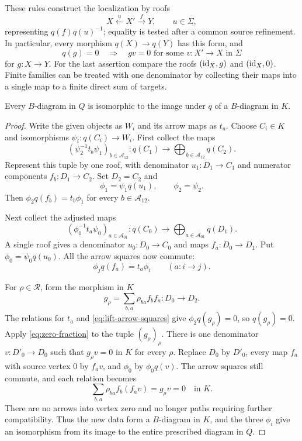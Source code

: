 These rules construct the localization by roofs
\[
  X\xleftarrow{u}X'\xrightarrow{f}Y,
  \qquad u\in\Sigma,
\]
representing $q(f)q(u)^{-1}$; equality is tested after a common source
refinement.  In particular, every morphism $q(X)\to q(Y)$ has this
form, and
\begin{equation}\label{eq:zero-fraction}
  q(g)=0\quad\Longrightarrow\quad
  gv=0\text{ for some }v:X'\to X\text{ in }\Sigma
\end{equation}
for $g:X\to Y$.  For the last assertion compare the roofs
$(\operatorname{id}_X,g)$ and $(\operatorname{id}_X,0)$.
Finite families can be treated with one denominator by collecting
their maps into a single map to a finite direct sum of targets.

\begin{lemma}\label{lem:diagram-lift}
Every $B$-diagram in $Q$ is isomorphic to the image under $q$ of a
$B$-diagram in $K$.
\end{lemma}

\begin{proof}
Write the given objects as $W_i$ and its arrow maps as $t_a$.
Choose $C_i\in K$ and isomorphisms $\psi_i:q(C_i)\to W_i$.
First collect the maps
\[
  (\psi_2^{-1}t_b\psi_1)_{b\in\mathcal A_{12}}:
     q(C_1)\longrightarrow
     \bigoplus_{b\in\mathcal A_{12}}q(C_2).
\]
Represent this tuple by one roof, with denominator
$u_1:D_1\to C_1$ and numerator components $f_b:D_1\to C_2$.
Set $D_2=C_2$ and
\[
  \phi_1=\psi_1q(u_1),\qquad \phi_2=\psi_2.
\]
Then $\phi_2q(f_b)=t_b\phi_1$ for every $b\in\mathcal A_{12}$.

Next collect the adjusted maps
\[
  (\phi_1^{-1}t_a\psi_0)_{a\in\mathcal A_{01}}:
     q(C_0)\longrightarrow
     \bigoplus_{a\in\mathcal A_{01}}q(D_1).
\]
A single roof gives a denominator $u_0:D_0\to C_0$ and maps
$f_a:D_0\to D_1$.  Put $\phi_0=\psi_0q(u_0)$.
All the arrow squares now commute:
\begin{equation}\label{eq:lift-arrow-squares}
  \phi_jq(f_a)=t_a\phi_i\qquad(a:i\to j).
\end{equation}

For $\rho\in\mathcal R$, form the morphism in $K$
\[
  g_\rho=\sum_{b,a}\rho_{ba}f_bf_a:D_0\longrightarrow D_2.
\]
The relations for $t_a$ and \eqref{eq:lift-arrow-squares} give
$\phi_2q(g_\rho)=0$, so $q(g_\rho)=0$.
Apply \eqref{eq:zero-fraction} to the tuple $(g_\rho)_\rho$.
There is one denominator $v:D'_0\to D_0$ such that
$g_\rho v=0$ in $K$ for every $\rho$.
Replace $D_0$ by $D'_0$, every map $f_a$ with source vertex $0$ by
$f_av$, and $\phi_0$ by $\phi_0q(v)$.
The arrow squares still commute, and each relation becomes
\[
  \sum_{b,a}\rho_{ba}f_b(f_av)=g_\rho v=0
  \quad\text{in }K.
\]
There are no arrows into vertex zero and no longer paths requiring
further compatibility.  Thus the new data form a $B$-diagram in $K$,
and the three $\phi_i$ give an isomorphism from its image to the
entire prescribed diagram in $Q$.
\end{proof}

